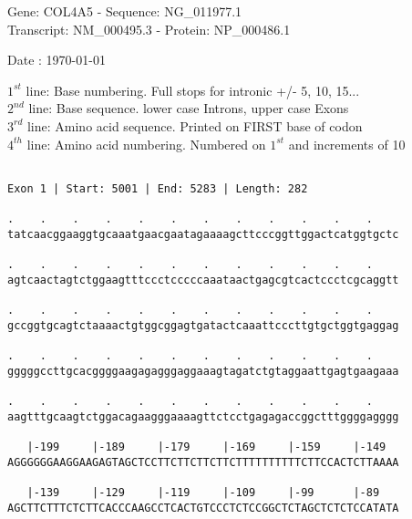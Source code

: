 \documentclass{article}
\begin{document}
\begin{center}
\begin{large}
Gene: COL4A5 - Sequence: NG\_011977.1\\
Transcript: NM\_000495.3 - Protein: NP\_000486.1
 
 Date : \today
\end{large}
\end{center}
$1^{st}$ line: Base numbering. Full stops for intronic +/- 5, 10, 15...\\
$2^{nd}$ line: Base sequence. lower case Introns, upper case Exons\\
$3^{rd}$ line: Amino acid sequence. Printed on FIRST base of codon\\
$4^{th}$ line: Amino acid numbering. Numbered on $1^{st}$ and increments of 10\\
 \begin{Verbatim}
 
Exon 1 | Start: 5001 | End: 5283 | Length: 282
 
.    .    .    .    .    .    .    .    .    .    .    .    
tatcaacggaaggtgcaaatgaacgaatagaaaagcttcccggttggactcatggtgctc
                                                            
.    .    .    .    .    .    .    .    .    .    .    .    
agtcaactagtctggaagtttccctcccccaaataactgagcgtcactccctcgcaggtt
                                                            
.    .    .    .    .    .    .    .    .    .    .    .    
gccggtgcagtctaaaactgtggcggagtgatactcaaattcccttgtgctggtgaggag
                                                            
.    .    .    .    .    .    .    .    .    .    .    .    
gggggccttgcacggggaagagagggaggaaagtagatctgtaggaattgagtgaagaaa
                                                            
.    .    .    .    .    .    .    .    .    .    .    .    
aagtttgcaagtctggacagaagggaaaagttctcctgagagaccggctttggggagggg
                                                            
   |-199     |-189     |-179     |-169     |-159     |-149  
AGGGGGGAAGGAAGAGTAGCTCCTTCTTCTTCTTCTTTTTTTTTTCTTCCACTCTTAAAA
                                                            
   |-139     |-129     |-119     |-109     |-99      |-89   
AGCTTCTTTCTCTTCACCCAAGCCTCACTGTCCCTCTCCGGCTCTAGCTCTCTCCATATA
                                                            

\end{Verbatim}
\end{document}
